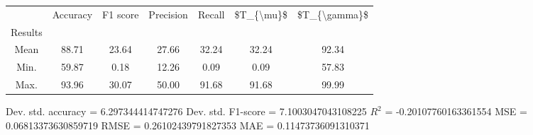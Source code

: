 \begin{tabular}{|c|c|c|c|c|c|c|}
\toprule
{} &  Accuracy &  F1 score &  Precision &  Recall &  \$T\_\{\textbackslash mu\}\$ &  \$T\_\{\textbackslash gamma\}\$ \\
Results &           &           &            &         &            &               \\
\hline
Mean    &     88.71 &     23.64 &      27.66 &   32.24 &      32.24 &         92.34 \\
Min.    &     59.87 &      0.18 &      12.26 &    0.09 &       0.09 &         57.83 \\
Max.    &     93.96 &     30.07 &      50.00 &   91.68 &      91.68 &         99.99 \\
\bottomrule
\end{tabular}

 Dev. std. accuracy = 6.297344414747276
 Dev. std. F1-score = 7.1003047043108225
 $R^2$ = -0.20107760163361554
 MSE = 0.06813373630859719
 RMSE = 0.26102439791827353
 MAE = 0.11473736091310371